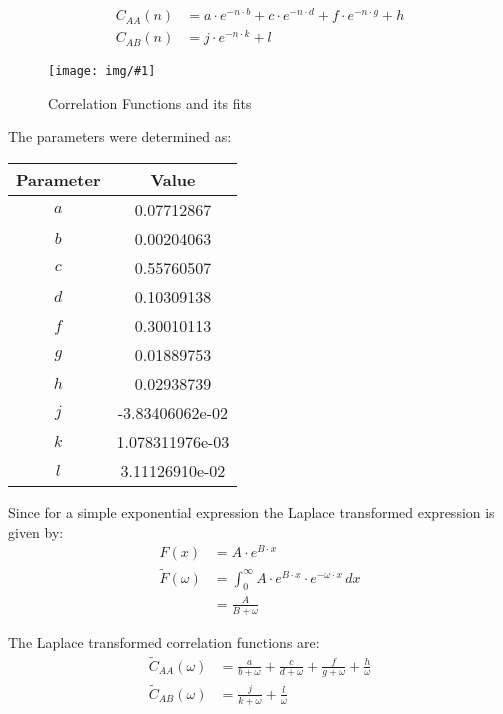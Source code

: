 \documentclass[a4paper, parskip=half]{scrartcl}
\newcommand{\myImage}[2]{
	\begin{figure}[ht!]
	\centering
	\texttt{[image: img/\#1]}
	\caption{#2}
	\label{pic:#1}
	\end{figure}
}
\begin{document}
\begin{align}
C_{AA}(n) &= a \cdot e^{- n \cdot b} + c \cdot e^{- n \cdot d} + f \cdot e^{-n \cdot g} + h\\
C_{AB}(n) &= j \cdot e^{- n \cdot k} + l
\end{align}

\myImage{caa_cab}{Correlation Functions and its fits}

The parameters were determined as:
\begin{center}
\begin{tabular}{c|c}
Parameter & Value \\\hline
$a$ & 0.07712867\\
$b$ & 0.00204063\\
$c$ & 0.55760507\\
$d$ & 0.10309138\\
$f$ & 0.30010113\\
$g$ & 0.01889753\\
$h$ & 0.02938739\\
$j$ & -3.83406062e-02\\
$k$ & 1.078311976e-03\\
$l$ & 3.11126910e-02
\end{tabular}
\end{center}

Since for a simple exponential expression the Laplace transformed expression is given by:
\begin{align}
F(x) &= A \cdot e^{B\cdot x} \\
\widetilde{F}(\omega) &= \int_0^\infty A \cdot e^{B\cdot x} \cdot e^{-\omega\cdot x}\, dx \\
&= \frac{A}{B + \omega}
\end{align}

The Laplace transformed correlation functions are:
\begin{align}
\widetilde{C}_{AA}(\omega) &= \frac{a}{b + \omega} + \frac{c}{d + \omega} + \frac{f}{g + \omega} + \frac{h}{\omega} \\
\widetilde{C}_{AB}(\omega) &= \frac{j}{k + \omega} + \frac{l}{\omega}
\end{align}
\end{document}
